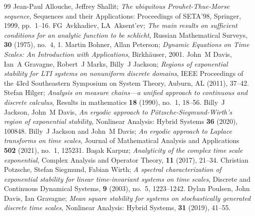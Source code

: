 \documentclass[10pt,a4paper]{amsart}
\numberwithin{equation}{section}
\begin{document}
\begin{thebibliography}{99}
 Jean-Paul Allouche, Jeffrey Shallit; \emph{The ubiquitous {P}rouhet-{T}hue-{M}orse sequence}, Sequences and their Applications: Proceedings of SETA'98, Springer, 1999, pp.~1--16.
 FG~Avkhadiev, LA~Aksent'ev; \emph{The main results on sufficient conditions for an analytic function to be schlicht}, Russian Mathematical Surveys, \textbf{30} (1975), no.~4, 1.
 Martin Bohner, Allan Peterson; \emph{Dynamic {E}quations on {T}ime {S}cales: {A}n {I}ntroduction with {A}pplications}, Birkh\"auser, 2001.
 John~M Davis, Ian~A Gravagne, Robert~J Marks, Billy~J Jackson; \emph{Regions of exponential stability for {LTI} systems on nonuniform discrete domains}, IEEE Proceedings of the 43rd Southeastern Symposium on System Theory, Auburn, AL (2011), 37--42.
 Stefan Hilger; \emph{Analysis on measure chains---a unified approach to continuous and discrete calculus}, Results in mathematics \textbf{18} (1990), no.~1, 18--56.
 Billy~J Jackson, John~M Davis, \emph{An ergodic approach to {P}\"otzsche-{S}iegmund-{W}irth's region of exponential stability}, Nonlinear Analysis: Hybrid Systems \textbf{36} (2020), 100848.
 Billy~J {J}ackson and John~M {D}avis; \emph{An ergodic approach to {L}aplace transforms on time scales}, Journal of Mathematical Analysis and Applications \textbf{502} (2021), no.~1, 125231.
 Ba{\c{s}}ak Karpuz; \emph{Analyticity of the complex time scale exponential}, Complex Analysis and Operator Theory, \textbf{11} (2017), 21--34.
 Christian Potzsche, Stefan Siegmund, Fabian Wirth; \emph{A spectral characterization of exponential stability for linear time-invariant systems on time scales}, Discrete and Continuous Dynamical Systems, \textbf{9} (2003), no.~5, 1223--1242.
 Dylan Poulsen, John Davis, Ian Gravagne; \emph{Mean square stability for systems on stochastically generated discrete time scales}, Nonlinear Analysis: Hybrid Systems, \textbf{31} (2019), 41--55.
\end{thebibliography}
\end{document}
